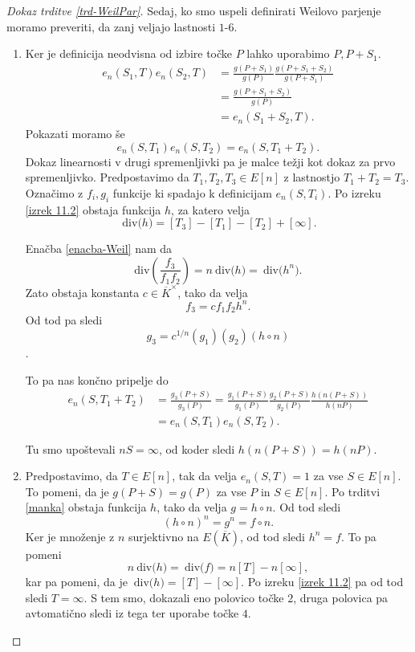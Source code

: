 \documentclass[12pt,a4paper,twoside]{article}
\theoremstyle{definition} %
\theoremstyle{plain} %
\numberwithin{equation}{section}  %
\newcommand{\Div}[1]{\ \text{div(}{#1}\text{)}}
\begin{document}
\begin{proof}[Dokaz trditve \ref{trd-WeilPar}]
Sedaj, ko smo uspeli definirati Weilovo parjenje moramo preveriti, da zanj veljajo lastnosti $1$-$6$.
\begin{enumerate}
\item Ker je definicija neodvisna od izbire točke $P$ lahko uporabimo $P,P+S_1$.
\begin{align}
e_n(S_1,T)e_n(S_2,T) &{}= \frac{g(P+S_1)}{g(P)} \frac{g(P+S_1+S_2)}{g(P+S_1)} \nonumber \\
&{} = \frac{g(P+S_1+S_2)}{g(P)} \nonumber \\
&{} = e_n(S_1+S_2,T). \nonumber
\end{align}
Pokazati moramo še
$$e_n(S,T_1)e_n(S,T_2) = e_n(S,T_1+T_2).$$
Dokaz linearnosti v drugi spremenljivki pa je malce težji kot dokaz za prvo spremenljivko.
Predpostavimo da $T_1,T_2,T_3 \in E[n]$ z lastnostjo $T_1 +T_2 = T_3.$ Označimo z $f_i,g_i$ funkcije ki spadajo k definicijam $e_n(S,T_i)$.
Po izreku \ref{izrek 11.2} obstaja funkcija $h$, za katero velja
$$\Div{h} = [T_3]-[T_1]-[T_2] + [\infty].$$

Enačba \ref{enacba-Weil} nam da
$$\text{div} \left(  \frac{f_3}{f_1f_2}\right) = n \Div{h} = \Div{h^n}.$$
Zato obstaja konstanta $c \in \overline{K}^{\times}$, tako da velja
$$f_3 = cf_1f_2h^n.$$
Od tod pa sledi
$$g_3 = c^{1/n}(g_1)(g_2)(h \circ n)$$.

To pa nas končno pripelje do
\begin{align}
e_n(S,T_1+T_2) &{}= \frac{g_3(P+S)}{g_3(P)} = \frac{g_1(P+S)}{g_1(P)} \frac{g_2(P+S)}{g_2(P)} \frac{h(n(P+S))}{h(nP)} \nonumber \\
&{} = e_n(S,T_1)e_n(S,T_2). \nonumber
\end{align}

Tu smo upoštevali $nS = \infty$, od koder sledi $h(n(P+S)) = h(nP)$.

\item Predpostavimo, da $T \in E[n]$, tak da velja $e_n(S,T)=1$ za vse $S \in E[n]$. To pomeni, da je $g(P+S) = g(P)$ za vse $P$ in $S \in E[n]$. Po trditvi \ref{manka}%
obstaja funkcija $h$, tako da velja $g = h \circ n$. Od tod sledi 
$$(h \circ n) ^n = g^n = f \circ n.$$
Ker je množenje z $n$ surjektivno na $E(\overline{K})$, od tod sledi $h^n = f$. %
To pa pomeni
$$n\Div{h} = \Div{f} = n[T]-n[\infty],$$
kar pa pomeni, da je $\Div{h} = [T] - [\infty]$. Po izreku \ref{izrek 11.2} pa od tod sledi $T = \infty$. S tem smo, dokazali eno polovico točke $2$, druga polovica pa avtomatično sledi iz tega ter uporabe točke $4$.


\end{enumerate}
\end{proof}
\end{document}
